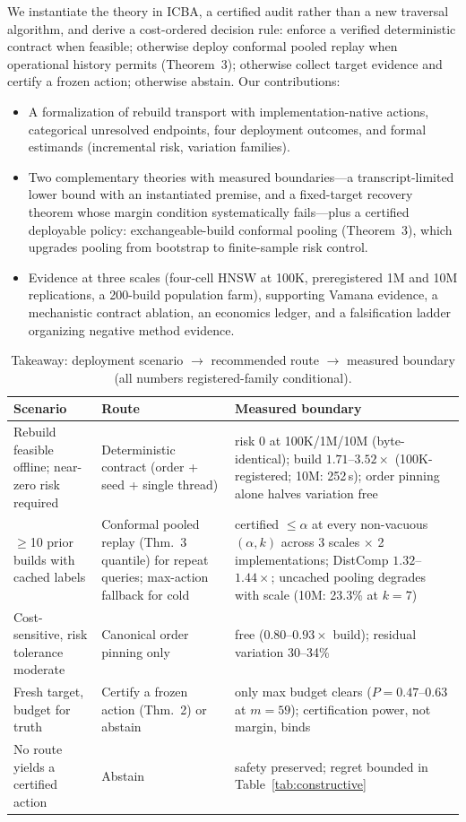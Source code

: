\documentclass{article}
\begin{document}
We instantiate the theory in ICBA, a certified audit rather than a new traversal algorithm, and derive a
cost-ordered decision rule: enforce a verified deterministic contract when feasible; otherwise deploy
conformal pooled replay when operational history permits (Theorem~3); otherwise collect target evidence
and certify a frozen action; otherwise abstain. Our contributions:
\begin{itemize}\itemsep1pt
\item A formalization of rebuild transport with implementation-native actions, categorical unresolved
endpoints, four deployment outcomes, and formal estimands (incremental risk, variation families).
\item Two complementary theories with measured boundaries---a transcript-limited lower bound with an
instantiated premise, and a fixed-target recovery theorem whose margin condition systematically
fails---plus a certified deployable policy: exchangeable-build conformal pooling (Theorem~3), which
upgrades pooling from bootstrap to finite-sample risk control.
\item Evidence at three scales (four-cell HNSW at 100K, preregistered 1M and 10M replications, a
200-build population farm), supporting Vamana evidence, a mechanistic contract ablation, an economics
ledger, and a falsification ladder organizing negative method evidence.
\end{itemize}

\begin{table}[t]
\centering
\caption{Takeaway: deployment scenario $\rightarrow$ recommended route $\rightarrow$ measured boundary (all numbers registered-family conditional).}
\label{tab:takeaway}
\footnotesize
\setlength{\tabcolsep}{3pt}
\begin{tabular}{p{3.2cm}p{3.9cm}p{6.5cm}}
\toprule
Scenario & Route & Measured boundary \\
\midrule
Rebuild feasible offline; near-zero risk required & Deterministic contract (order + seed + single thread) & risk 0 at 100K/1M/10M (byte-identical); build $1.71$--$3.52\times$ (100K-registered; 10M: 252\,s); order pinning alone halves variation free \\
$\ge$10 prior builds with cached labels & Conformal pooled replay (Thm.~3 quantile) for repeat queries; max-action fallback for cold & certified $\le\alpha$ at every non-vacuous $(\alpha,k)$ across 3 scales $\times$ 2 implementations; DistComp $1.32$--$1.44\times$; uncached pooling degrades with scale (10M: 23.3\% at $k{=}7$) \\
Cost-sensitive, risk tolerance moderate & Canonical order pinning only & free ($0.80$--$0.93\times$ build); residual variation 30--34\% \\
Fresh target, budget for truth & Certify a frozen action (Thm.~2) or abstain & only max budget clears ($P{=}0.47$--$0.63$ at $m{=}59$); certification power, not margin, binds \\
No route yields a certified action & Abstain & safety preserved; regret bounded in Table~\ref{tab:constructive} \\
\bottomrule
\end{tabular}
\end{table}
\end{document}
